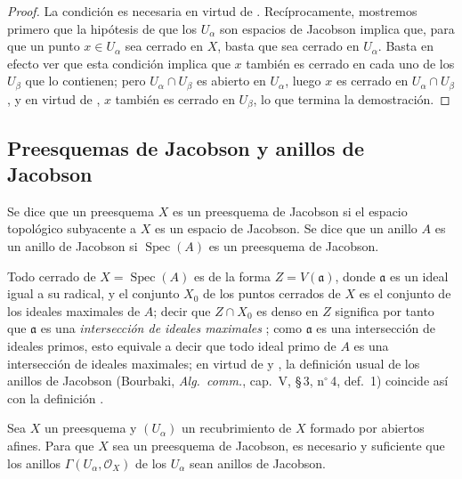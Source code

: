 \begin{proof}
La condición es necesaria en virtud de .
Recíprocamente, mostremos primero que la hipótesis de que los $U_\alpha$ son espacios de Jacobson implica que, para que un punto $x\in U_\alpha$ sea cerrado en $X$, basta que sea cerrado en $U_\alpha$.
Basta en efecto ver que esta condición implica que $x$ también es cerrado en cada uno de los $U_\beta$ que lo contienen; pero $U_\alpha\cap U_\beta$ es abierto en $U_\alpha$, luego $x$ es cerrado en $U_\alpha\cap U_\beta$, y en virtud de , $x$ también es cerrado en $U_\beta$, lo que termina la demostración.
\end{proof}

\subsection{Preesquemas de Jacobson y anillos de Jacobson}
\label{subsection:IV.10.4}

\begin{definition}[10.4.1]
\label{IV.10.4.1}
Se dice que un preesquema $X$ es un preesquema de Jacobson si el espacio topológico subyacente a $X$ es un espacio de Jacobson.
Se dice que un anillo $A$ es un anillo de Jacobson si $\operatorname{Spec}(A)$ es un preesquema de Jacobson.
\end{definition}

Todo cerrado de $X=\operatorname{Spec}(A)$ es de la forma $Z=V(\mathfrak a)$, donde $\mathfrak a$ es un ideal igual a su radical, y el conjunto $X_0$ de los puntos cerrados de $X$ es el conjunto de los ideales maximales de $A$; decir que $Z\cap X_0$ es denso en $Z$ significa por tanto que $\mathfrak a$ es una \emph{intersección de ideales maximales} ; como $\mathfrak a$ es una intersección de ideales primos, esto equivale a decir que todo ideal primo de $A$ es una intersección de ideales maximales; en virtud de  y , la definición usual de los anillos de Jacobson (Bourbaki, \emph{Alg.\ comm.}, cap.~V, \S\,3, n$^\circ$\,4, def.~1) coincide así con la definición .




\begin{proposition}[10.4.2]
\label{IV.10.4.2}

Sea $X$ un preesquema y $(U_\alpha)$ un recubrimiento de $X$ formado por abiertos afines.
Para que $X$ sea un preesquema de Jacobson, es necesario y suficiente que los anillos $\Gamma(U_\alpha,\mathcal O_X)$ de los $U_\alpha$ sean anillos de Jacobson.
\end{proposition}

